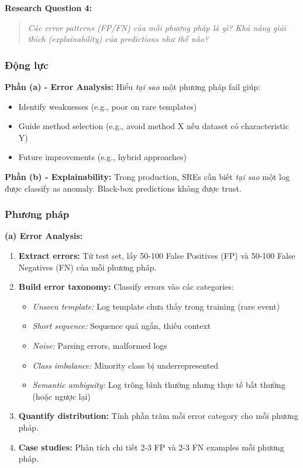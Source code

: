 \textbf{Research Question 4:}

\begin{quote}
\textit{Các error patterns (FP/FN) của mỗi phương pháp là gì? Khả năng giải thích (explainability) của predictions như thế nào?}
\end{quote}

\subsubsection{Động lực}

\textbf{Phần (a) - Error Analysis:} Hiểu \textit{tại sao} một phương pháp fail giúp:
\begin{itemize}
    \item Identify weaknesses (e.g., poor on rare templates)
    \item Guide method selection (e.g., avoid method X nếu dataset có characteristic Y)
    \item Future improvements (e.g., hybrid approaches)
\end{itemize}

\textbf{Phần (b) - Explainability:} Trong production, SREs cần biết \textit{tại sao} một log được classify as anomaly. Black-box predictions không được trust.

\subsubsection{Phương pháp}

\textbf{(a) Error Analysis:}

\begin{enumerate}
    \item \textbf{Extract errors:} Từ test set, lấy 50-100 False Positives (FP) và 50-100 False Negatives (FN) của mỗi phương pháp.
    
    \item \textbf{Build error taxonomy:} Classify errors vào các categories:
    \begin{itemize}
        \item \textit{Unseen template:} Log template chưa thấy trong training (rare event)
        \item \textit{Short sequence:} Sequence quá ngắn, thiếu context
        \item \textit{Noise:} Parsing errors, malformed logs
        \item \textit{Class imbalance:} Minority class bị underrepresented
        \item \textit{Semantic ambiguity:} Log trông bình thường nhưng thực tế bất thường (hoặc ngược lại)
    \end{itemize}
    
    \item \textbf{Quantify distribution:} Tính phần trăm mỗi error category cho mỗi phương pháp.
    
    \item \textbf{Case studies:} Phân tích chi tiết 2-3 FP và 2-3 FN examples mỗi phương pháp.
\end{enumerate}

